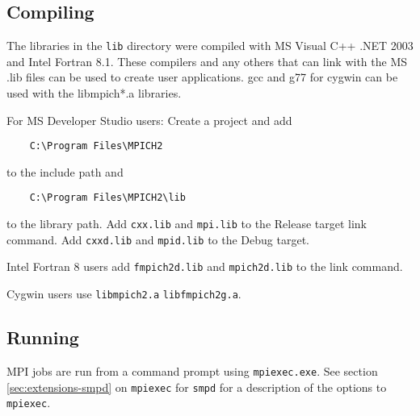 \documentclass[dvipdfm,11pt]{article}
\begin{document}
\subsection{Compiling}
\label{sec:wincompile}

The libraries in the \texttt{lib} directory were compiled with MS Visual C++ .NET 2003
and Intel Fortran 8.1.  These 
compilers and any others that can link with the MS .lib files can be used to
create user applications.  gcc and g77 for cygwin can be used with the 
libmpich*.a libraries.

For MS Developer Studio users: Create a project and add
\begin{verbatim}
    C:\Program Files\MPICH2
\end{verbatim}
to the include path and
\begin{verbatim}
    C:\Program Files\MPICH2\lib
\end{verbatim}
to
the library path.  Add \texttt{cxx.lib} and \texttt{mpi.lib} to the
Release target link command.  Add \texttt{cxxd.lib} and
\texttt{mpid.lib} to the Debug target.

Intel Fortran 8 users add \texttt{fmpich2d.lib} and \texttt{mpich2d.lib} to the link command.

Cygwin users use \texttt{libmpich2.a} \texttt{libfmpich2g.a}.

\subsection{Running}
\label{sec:winrun}

MPI jobs are run from a command prompt using \texttt{mpiexec.exe}.  See
section \ref{sec:extensions-smpd} on \texttt{mpiexec} for \texttt{smpd}
for a description of the options to \texttt{mpiexec}.




\end{document}

